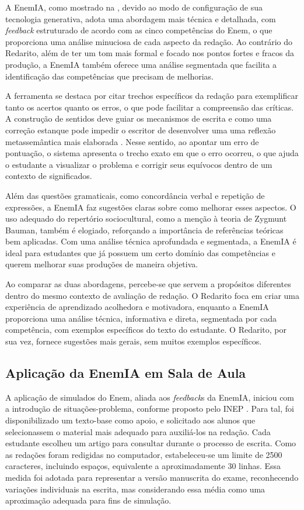 \documentclass[portuguese]{textolivre}
\begin{document}
A EnemIA, como mostrado na , devido ao modo de configuração de sua tecnologia generativa, adota uma abordagem mais técnica e detalhada, com \textit{feedback} estruturado de acordo com as cinco competências do Enem, o que proporciona uma análise minuciosa de cada aspecto da redação. Ao contrário do Redarito, além de ter um tom mais formal e focado nos pontos fortes e fracos da produção, a EnemIA também oferece uma análise segmentada que facilita a identificação das competências que precisam de melhorias. 

A ferramenta se destaca por citar trechos específicos da redação para exemplificar tanto os acertos quanto os erros, o que pode facilitar a compreensão das críticas. A construção de sentidos deve guiar os mecanismos de escrita e como uma correção estanque pode impedir o escritor de desenvolver uma uma reflexão metassemântica mais elaborada \cite{koch2003texto}. Nesse sentido, ao apontar um erro de pontuação, o sistema apresenta o trecho exato em que o erro ocorreu, o que ajuda o estudante a visualizar o problema e corrigir seus equívocos dentro de um contexto de significados. 

Além das questões gramaticais, como concordância verbal e repetição de expressões, a EnemIA faz sugestões claras sobre como melhorar esses aspectos. O uso adequado do repertório sociocultural, como a menção à teoria de Zygmunt Bauman, também é elogiado, reforçando a importância de referências teóricas bem aplicadas. Com uma análise técnica aprofundada e segmentada, a EnemIA é ideal para estudantes que já possuem um certo domínio das competências e querem melhorar suas produções de maneira objetiva.

Ao comparar as duas abordagens, percebe-se que servem a propósitos diferentes dentro do mesmo contexto de avaliação de redação. O Redarito foca em criar uma experiência de aprendizado acolhedora e motivadora, enquanto a EnemIA proporciona uma análise técnica, informativa e direta, segmentada por cada competência, com exemplos específicos do texto do estudante. O Redarito, por sua vez, fornece sugestões mais gerais, sem muitos exemplos específicos.

\subsection{\textbf{Aplicação da EnemIA em Sala de Aula}}

A aplicação de simulados do Enem, aliada aos \textit{feedback}s da EnemIA, iniciou com a introdução de situações-problema, conforme proposto pelo INEP \cite{inep2020edital}. Para tal, foi disponibilizado um texto-base como apoio, e solicitado aos alunos que selecionassem o material mais adequado para auxiliá-los na redação. Cada estudante escolheu um artigo para consultar durante o processo de escrita. Como as redações foram redigidas no computador, estabeleceu-se um limite de 2500 caracteres, incluindo espaços, equivalente a aproximadamente 30 linhas. Essa medida foi adotada para representar a versão manuscrita do exame, reconhecendo variações individuais na escrita, mas considerando essa média como uma aproximação adequada para fins de simulação.
\end{document}
